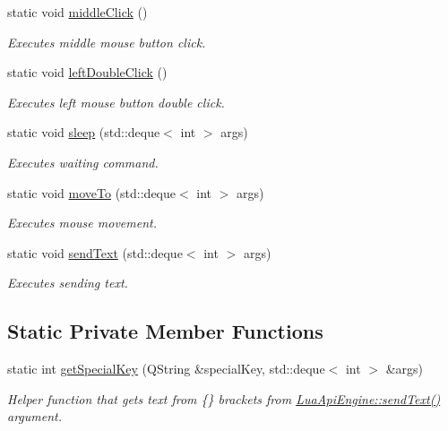 \begin{DoxyCompactItemize}
static void \hyperlink{class_lua_api_engine_a633c229323434db2d1af7f66c1517a34}{middle\-Click} ()
\begin{DoxyCompactList}\small\item\em Executes middle mouse button click. \end{DoxyCompactList}\item 
static void \hyperlink{class_lua_api_engine_a2004f3ce56fc785e0276491642e39e7a}{left\-Double\-Click} ()
\begin{DoxyCompactList}\small\item\em Executes left mouse button double click. \end{DoxyCompactList}\item 
static void \hyperlink{class_lua_api_engine_a6910c482ffa6327999b49504522991b7}{sleep} (std\-::deque$<$ int $>$ args)
\begin{DoxyCompactList}\small\item\em Executes waiting command. \end{DoxyCompactList}\item 
static void \hyperlink{class_lua_api_engine_a8512ba309e37218b1586f8a41cae4451}{move\-To} (std\-::deque$<$ int $>$ args)
\begin{DoxyCompactList}\small\item\em Executes mouse movement. \end{DoxyCompactList}\item 
static void \hyperlink{class_lua_api_engine_a396ae61c3f7c771f5fe06584cef15169}{send\-Text} (std\-::deque$<$ int $>$ args)
\begin{DoxyCompactList}\small\item\em Executes sending text. \end{DoxyCompactList}\end{DoxyCompactItemize}
\subsection*{Static Private Member Functions}
\begin{DoxyCompactItemize}
\item 
static int \hyperlink{class_lua_api_engine_ac1b8a6a2ea07065dc1c3f7eed7937d8d}{get\-Special\-Key} (Q\-String \&special\-Key, std\-::deque$<$ int $>$ \&args)
\begin{DoxyCompactList}\small\item\em Helper function that gets text from \{\} brackets from \hyperlink{class_lua_api_engine_a396ae61c3f7c771f5fe06584cef15169}{Lua\-Api\-Engine\-::send\-Text()} argument. \end{DoxyCompactList}\end{DoxyCompactItemize}
